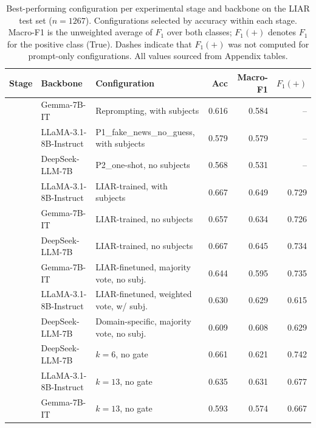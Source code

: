 \begin{table}[!htbp]
\centering
\scriptsize
\setlength{\tabcolsep}{4pt}
\renewcommand{\arraystretch}{1.2}
\caption{Best-performing configuration per experimental stage and backbone on the LIAR test set ($n = 1267$). Configurations selected by accuracy within each stage. Macro-F1 is the unweighted average of $F_1$ over both classes; $F_1(+)$ denotes $F_1$ for the positive class (True). Dashes indicate that $F_1(+)$ was not computed for prompt-only configurations. All values sourced from Appendix tables.}
\label{tab:consolidated}
\begin{tabular}{l l l r r r}
\toprule
Stage & Backbone & Configuration & Acc & Macro-F1 & $F_1(+)$ \\
\midrule
{}
  & Gemma-7B-IT           & Reprompting, with subjects              & 0.616 & 0.584 & -- \\
  & LLaMA-3.1-8B-Instruct & P1\_fake\_news\_no\_guess, with subjects & 0.579 & 0.579 & -- \\
  & DeepSeek-LLM-7B       & P2\_one-shot, no subjects               & 0.568 & 0.531 & -- \\
\midrule
{}
  & LLaMA-3.1-8B-Instruct & LIAR-trained, with subjects             & 0.667 & 0.649 & 0.729 \\
  & Gemma-7B-IT           & LIAR-trained, no subjects               & 0.657 & 0.634 & 0.726 \\
  & DeepSeek-LLM-7B       & LIAR-trained, no subjects               & 0.667 & 0.645 & 0.734 \\
\midrule
{}
  & Gemma-7B-IT           & LIAR-finetuned, majority vote, no subj. & 0.644 & 0.595 & 0.735 \\
  & LLaMA-3.1-8B-Instruct & LIAR-finetuned, weighted vote, w/ subj. & 0.630 & 0.629 & 0.615 \\
  & DeepSeek-LLM-7B       & Domain-specific, majority vote, no subj.& 0.609 & 0.608 & 0.629 \\
\midrule
{}
  & DeepSeek-LLM-7B       & $k{=}6$, no gate                        & 0.661 & 0.621 & 0.742 \\
  & LLaMA-3.1-8B-Instruct & $k{=}13$, no gate                       & 0.635 & 0.631 & 0.677 \\
  & Gemma-7B-IT           & $k{=}13$, no gate                       & 0.593 & 0.574 & 0.667 \\
\bottomrule
\end{tabular}
\end{table}

